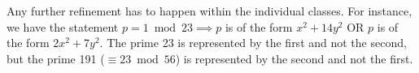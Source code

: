 Any further refinement has to happen within the individual classes. For instance, we have the statement $p=1\bmod 23\implies p$ is of the form $x^2+14y^2$ OR $p$ is of the form $2x^2+7y^2$. The prime 23 is represented by the first and not the second, but the prime 191 ($\equiv 23\bmod 56$) is represented by the second and not the first.
